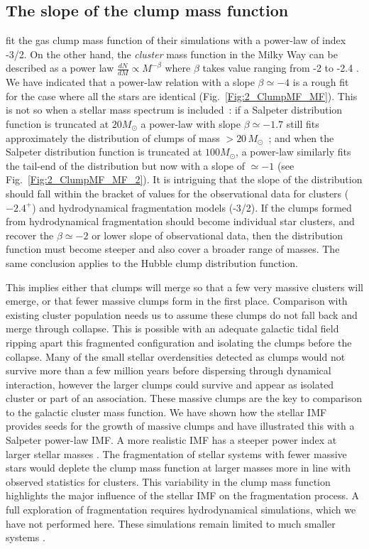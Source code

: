 \subsection*{The slope of the clump mass function}

\cite{Klessen2000,Klessen2001} fit the gas clump mass function of their simulations with a power-law of index -3/2. On the other hand, the \textit{cluster} mass function in the Milky Way can be described as a power law $\frac{dN}{dM} \propto M^{-\beta}$ where $\beta$ takes value ranging from -2 to -2.4 \citep{Haas2010}. We have indicated that a power-law relation with a slope $ \beta \simeq -4$ is a rough fit for the case where all the stars are identical (Fig.~\ref{Fig:2_ClumpMF_MF}). This is not so  when a stellar mass spectrum is included~: if a Salpeter distribution function is truncated at $20 M_\odot$ a power-law with slope $ \beta \simeq -1.7$ still fits approximately the distribution of clumps of  mass $ > 20\, M_\odot$~; and when the Salpeter distribution function is truncated at $100 M_\odot$, a power-law similarly fits the tail-end of the distribution but now with a slope of $\simeq -1$ (see Fig.~\ref{Fig:2_ClumpMF_MF_2}). It is intriguing that the slope of the distribution should fall within the bracket of values for the observational data for clusters ($-2.4^+$) and hydrodynamical fragmentation models (-3/2). If the clumps formed from hydrodynamical fragmentation should become individual star clusters, and recover the $\beta \simeq -2 $ or lower slope of observational data, then the distribution function must become steeper and also cover a broader range of masses. The same conclusion applies to the Hubble clump distribution function.

This implies either that clumps will merge so that a few very massive clusters will emerge, or that fewer massive clumps form in the first place. Comparison with existing cluster population needs us to assume these clumps do not fall back and merge through collapse. This is possible with an adequate galactic tidal field ripping apart this fragmented configuration and isolating the clumps before the collapse. Many of the small stellar overdensities detected as clumps would not survive more than a few million years before dispersing through dynamical interaction, however the larger clumps could survive and appear as isolated cluster or part of an association. These massive clumps   are the key to comparison to the galactic cluster mass function. We have shown how the stellar IMF provides seeds for the growth of massive clumps and have illustrated this with a Salpeter power-law IMF. A more realistic  IMF has a steeper power index at larger stellar masses \citep{Kroupa2002,Chabrier2005}. The fragmentation of stellar systems with fewer massive stars would deplete the clump mass function at larger masses more in line with observed statistics for clusters. 
This variability in the clump mass function highlights the major influence of the stellar IMF on the fragmentation process. A full exploration of fragmentation requires hydrodynamical simulations, which we have not performed here. These simulations remain limited to much smaller systems \citep{Bate2014,Lomax2014}.

